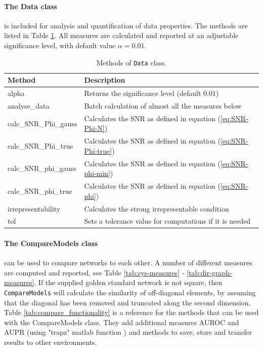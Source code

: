 \begin{bibunit}
\paragraph{The Data class}
\label{sec:data_class}
is included for analysis and quantification of data properties. The methods are listed in Table \ref{tab:data}.
All measures are calculated and reported at an adjustable significance level, with default value \(\alpha = 0.01\).

\begin{table}[htb]
\caption{\label{tab:data}
Methods of \texttt{Data} class.}
\centering
\begin{tabular}{|l|p{10cm}|}
\hline
Method & Description\\
\hline
alpha & Returns the significance level (default 0.01)\\
analyse\_data & Batch calculation of almost all the measures below\\
calc\_SNR\_Phi\_gauss & Calculates the SNR as defined in equation (\ref{eq:SNR-Phi-N})\\
calc\_SNR\_Phi\_true & Calculates the SNR as defined in equation (\ref{eq:SNR-Phi-true})\\
calc\_SNR\_phi\_gauss & Calculates the SNR as defined in equation (\ref{eq:SNR-phi-min})\\
calc\_SNR\_phi\_true & Calculates the SNR as defined in equation (\ref{eq:SNR-phi})\\
irrepresentability & Calculates the strong irrepresentable condition\\
tol & Sets a tolerance value for computations if it is needed\\
\hline
\end{tabular}
\end{table}

\paragraph{The CompareModels class}
\label{sec:compare-models}
can be used to compare networks to each other.
A number of different measures are computed and reported, see Table \ref{tab:sys-measures} -  \ref{tab:dir-graph-measures}.
If the supplied golden standard network is not square, then \texttt{CompareModels} will calculate the similarity of off-diagonal elements, by assuming that the diagonal has been removed and truncated along the second dimension.
Table \ref{tab:compare_functionality} is a reference for the methods that can be used with the CompareModels class. They add additional measures AUROC and AUPR (using "trapz" matlab function \cite{MATLAB2014}) and methods to save, store and transfer results to other environments.


\end{bibunit}
